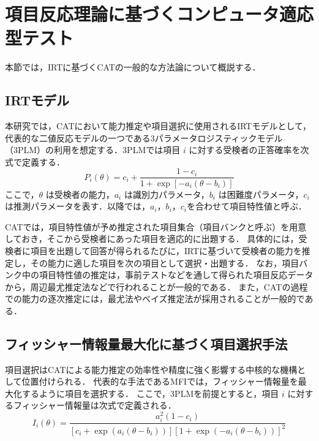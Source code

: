 \documentclass[dvipdfmx,a4j]{jarticle}
\begin{document}
\section{項目反応理論に基づくコンピュータ適応型テスト}

本節では，IRTに基づくCATの一般的な方法論について概説する．

\subsection{IRTモデル}

本研究では，CATにおいて能力推定や項目選択に使用されるIRTモデルとして，代表的な二値反応モデルの一つである3パラメータロジスティックモデル（3PLM）の利用を想定する．3PLMでは項目 $i$ に対する受検者の正答確率を次式で定義する．
\begin{equation}
P_i(\theta) = c_i + \frac{1 - c_i}{1 + \exp[-a_i(\theta - b_i)]}
\end{equation}
ここで，$\theta$ は受検者の能力，$a_i$ は識別力パラメータ，$b_i$ は困難度パラメータ，$c_i$ は推測パラメータを表す．以降では，$a_i$，$b_i$，$c_i$を合わせて項目特性値と呼ぶ．

CATでは，項目特性値が予め推定された項目集合（項目バンクと呼ぶ）を用意しておき，そこから受検者にあった項目を適応的に出題する．
具体的には，受検者に項目を出題して回答が得られるたびに，IRTに基づいて受検者の能力を推定し，その能力に適した項目を次の項目として選択・出題する．
なお，項目バンク中の項目特性値の推定は，事前テストなどを通して得られた項目反応データから，周辺最尤推定法などで行われることが一般的である．
また，CATの過程での能力の逐次推定には，最尤法やベイズ推定法が採用されることが一般的である．


\subsection{フィッシャー情報量最大化に基づく項目選択手法}

項目選択はCATによる能力推定の効率性や精度に強く影響する中核的な機構として位置付けられる．
代表的な手法であるMFIでは，フィッシャー情報量を最大化するように項目を選択する．
ここで，3PLMを前提とすると，項目 $i$ に対するフィッシャー情報量は次式で定義される．
\begin{equation}
I_i(\theta) =
\frac{a_i^2 (1 - c_i)}
{[c_i + \exp(a_i(\theta - b_i))][1 + \exp(-a_i(\theta - b_i))]^2}
\end{equation}
\end{document}
